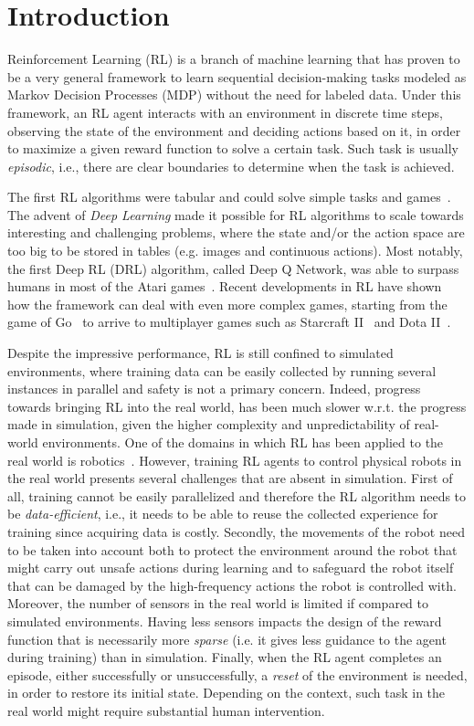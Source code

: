 \chapter{Introduction}

Reinforcement Learning (RL) is a branch of machine learning that has proven to be a very general framework to learn sequential decision-making tasks modeled as Markov Decision Processes (MDP) \citep{vanOtterlo2012} without the need for labeled data. Under this framework, an RL agent interacts with an environment in discrete time steps, observing the state of the environment and deciding actions based on it, in order to maximize a given reward function to solve a certain task. Such task is usually \textit{episodic}, i.e., there are clear boundaries to determine when the task is achieved.

The first RL algorithms were tabular and could solve simple tasks and games~\cite{Sutton1998}. The advent of \textit{Deep Learning} made it possible for RL algorithms to scale towards interesting and challenging problems, where the state and/or the action space are too big to be stored in tables (e.g. images and continuous actions). Most notably, the first Deep RL (DRL) algorithm, called Deep Q Network, was able to surpass humans in most of the Atari games~\cite{atari}. Recent developments in RL have shown how the framework can deal with even more complex games, starting from the game of Go~\cite{alphago} to arrive to multiplayer games such as Starcraft II~\cite{alphastar} and Dota II~\cite{opeaifive}.

Despite the impressive performance, RL is still confined to simulated environments, where training data can be easily collected by running several instances in parallel and safety is not a primary concern. Indeed, progress towards bringing RL into the real world, has been much slower w.r.t. the progress made in simulation, given the higher complexity and unpredictability of real-world environments. One of the domains in which RL has been applied to the real world is robotics~\cite{smith2022walk,pmlr-v164-raffin22a,gu2017deep}. However, training RL agents to control physical robots in the real world presents several challenges that are absent in simulation. First of all, training cannot be easily parallelized and therefore the RL algorithm needs to be \textit{data-efficient}, i.e., it needs to be able to reuse the collected experience for training since acquiring data is costly. Secondly, the movements of the robot need to be taken into account both to protect the environment around the robot that might carry out unsafe actions during learning and to safeguard the robot itself that can be damaged by the high-frequency actions the robot is controlled with. Moreover, the number of sensors in the real world is limited if compared to simulated environments. Having less sensors impacts the design of the reward function that is necessarily more \textit{sparse} (i.e. it gives less guidance to the agent during training) than in simulation. Finally, when the RL agent completes an episode, either successfully or unsuccessfully, a \textit{reset} of the environment is needed, in order to restore its initial state. Depending on the context, such task in the real world might require substantial human intervention.

